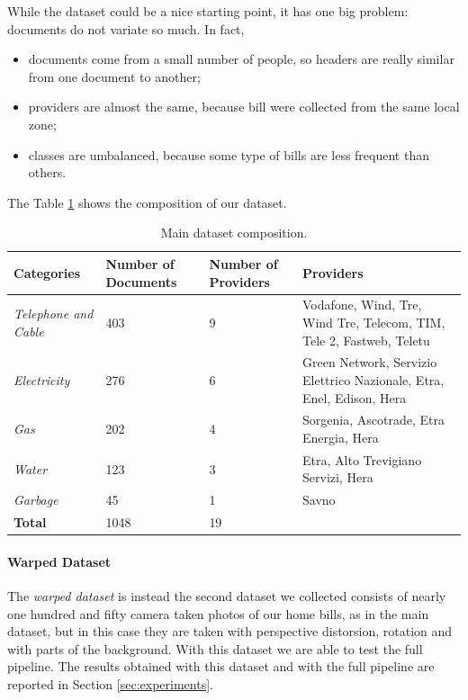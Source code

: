 \documentclass[10pt,twocolumn,letterpaper]{article}
\begin{document}
While the dataset could be a nice starting point, it has one big
problem: documents do not variate so much. In fact,
\begin{itemize}
  \item documents come from a small number of people, so headers are
    really similar from one document to another;
  \item providers are almost the same, because bill were collected
    from the same local zone;
  \item classes are umbalanced, because some type of bills are less
    frequent than others.
\end{itemize}

The Table \ref{table:main-dataset} shows the composition of our
dataset.

\bgroup
\def\arraystretch{1.5}%
\begin{table}[!h]
  \begin{center}
    \begin{tabular}{p{1.5cm} p{1.2cm} p{1.2cm} p{3cm}}
      \hline
      Categories  & Number of Documents & Number of Providers & Providers \\ \hline
      \emph{Telephone and Cable} & 403 & 9 & Vodafone, Wind, Tre, Wind Tre, Telecom, TIM, Tele 2, Fastweb, Teletu \\
      \emph{Electricity} & 276 & 6 & Green Network, Servizio Elettrico Nazionale, Etra, Enel, Edison, Hera \\
      \emph{Gas} & 202 & 4 & Sorgenia, Ascotrade, Etra Energia, Hera \\
      \emph{Water} & 123 & 3 & Etra, Alto Trevigiano Servizi, Hera \\
      \emph{Garbage} & 45 & 1 & Savno \\ \hline
      \textbf{Total} & 1048 & 19 &  \\ \hline
    \end{tabular}
  \end{center}
  \label{table:main-dataset}
  \caption{Main dataset composition.}
\end{table}
\egroup

\paragraph{Warped Dataset}
\label{par:warped-dataset}

The \emph{warped dataset} is instead the second dataset we collected
consists of nearly one hundred and fifty camera taken photos of our
home bills, as in the main dataset, but in this case they are taken
with perspective distorsion, rotation and with parts of the
background. With this dataset we are able to test the full
pipeline. The results obtained with this dataset and with the full
pipeline are reported in Section \ref{sec:experiments}.
\end{document}
